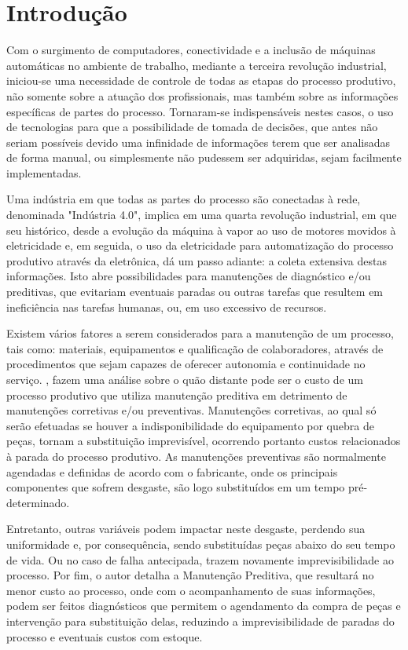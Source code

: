 \chapter{Introdução}
\label{chap:introducao}

Com o surgimento de computadores, conectividade e a inclusão de máquinas automáticas no ambiente de trabalho, mediante a terceira revolução industrial, iniciou-se uma necessidade de controle de todas as etapas do processo produtivo, não somente sobre a atuação dos profissionais, mas também sobre as informações específicas de partes do processo. Tornaram-se indispensáveis nestes casos, o uso de tecnologias para que a possibilidade de tomada de decisões, que antes não seriam possíveis devido uma infinidade de informações terem que ser analisadas de forma manual, ou simplesmente não pudessem ser adquiridas, sejam facilmente implementadas.

Uma indústria em que todas as partes do processo são conectadas à rede, denominada "Indústria 4.0", implica em uma quarta revolução industrial, em que seu histórico, desde a evolução da máquina à vapor ao uso de motores movidos à eletricidade e, em seguida, o uso da eletricidade para automatização do processo produtivo através da eletrônica, dá um passo adiante: a coleta extensiva destas informações. Isto abre possibilidades para manutenções de diagnóstico e/ou preditivas, que evitariam eventuais paradas ou outras tarefas que resultem em ineficiência nas tarefas humanas, ou, em uso excessivo de recursos.

Existem vários fatores a serem considerados para a manutenção de um processo, tais como: materiais, equipamentos e qualificação de colaboradores, através de procedimentos que sejam capazes de oferecer autonomia e continuidade no serviço. , fazem uma análise sobre o quão distante pode ser o custo de um processo produtivo que utiliza manutenção preditiva em detrimento de manutenções corretivas e/ou preventivas. Manutenções corretivas, ao qual só serão efetuadas se houver a indisponibilidade do equipamento por quebra de peças, tornam a substituição imprevisível, ocorrendo portanto custos relacionados à parada do processo produtivo. As manutenções preventivas são normalmente agendadas e definidas de acordo com o fabricante, onde os principais componentes que sofrem desgaste, são logo substituídos em um tempo pré-determinado.

Entretanto, outras variáveis podem impactar neste desgaste, perdendo sua uniformidade e, por consequência, sendo substituídas peças abaixo do seu tempo de vida. Ou no caso de falha antecipada, trazem novamente imprevisibilidade ao processo. Por fim, o autor detalha a Manutenção Preditiva, que resultará no menor custo ao processo, onde com o acompanhamento de suas informações, podem ser feitos diagnósticos que permitem o agendamento da compra de peças e intervenção para substituição delas, reduzindo a imprevisibilidade de paradas do processo e eventuais custos com estoque.

